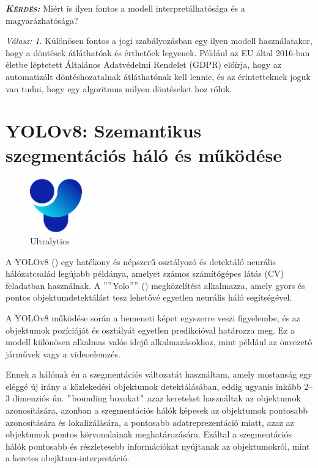 \documentclass[12pt,oneside,a4paper]{article}
\newcommand{\newsection}[1]{\clearpage\section{#1}}\label{makro}
\theoremstyle{remark}
\newtheorem*{remarkth}{Válasz: \newline}
\newenvironment{remark}{\begin{remarkth}}{\end{remarkth}}
\newenvironment{kerdes}{
    \medskip%
    \par\noindent\ignorespaces%
    \textit{\textsc{\textbf{Kérdés: }}}%
    \medskip
    \textsf%
}{%
\medskip
}
\begin{document}
\begin{kerdes}
    Miért is ilyen fontos a modell interpretálhatósága és a magyarázhatósága?
\end{kerdes}
\begin{remark}
    Különösen fontos a jogi szabályozásban egy ilyen modell használatakor, hogy a döntések átláthatóak és
    érthetőek legyenek.
    Például az \ac{EU} által 2016-ban életbe léptetett Általános Adatvédelmi Rendelet (\ac{GDPR}) előírja, hogy az
    automatizált döntéshozatalnak átláthatónak kell lennie, és az érintetteknek joguk van tudni, hogy egy algoritmus
    milyen döntéseket hoz róluk.
\end{remark}
\newsection{YOLOv8: Szemantikus szegmentációs háló és működése}\label{sec:yolov8:-szemantikus-szegmentacios-halo}
    \begin{figure}
        \centering
        \includegraphics[width=0.2\textwidth]{Ultralytics}
        \caption{Ultralytics}
        \label{fig:Ultralytics}
    \end{figure}
    A YOLOv8 (\cite{Yolov8})\label{irodalomhivatkozas} egy hatékony és népszerű osztályozó és detektáló neurális hálózatcsalád legújabb példánya,
    amelyet számos számítógépes látás (\ac{CV})
    feladatban használnak.
    A \(""\)\gls{Yolo}\(""\) () megközelítést alkalmazza,
    amely gyors és pontos objektumdetektálást tesz lehetővé egyetlen neurális háló segítségével.


    A YOLOv8 működése során a bemeneti képet egyszerre veszi figyelembe, és az objektumok pozícióját
és osztályát egyetlen predikcióval határozza meg.
Ez a modell különösen alkalmas valós
idejű alkalmazásokhoz, mint például az önvezető járművek vagy a videoelemzés.

Ennek a hálónak én a szegmentációs változatát használtam, amely mostanság egy eléggé új
irány a közlekedési objektumok detektálásában, eddig ugyanis inkább 2--3 dimenziós ún. \("\)bounding boxokat\("\)
azaz kereteket használtak az objektumok azonosítására, azonban a szegmentációs hálók képesek az objektumok
pontosabb azonosítására és lokalizálására, a pontosabb adatreprezentáció miatt, azaz az objektumok pontos körvonalainak meghatározására.
Ezáltal a szegmentációs hálók pontosabb és részletesebb információkat nyújtanak az objektumokról, mint a keretes obejktum-interpretáció.
\end{document}
